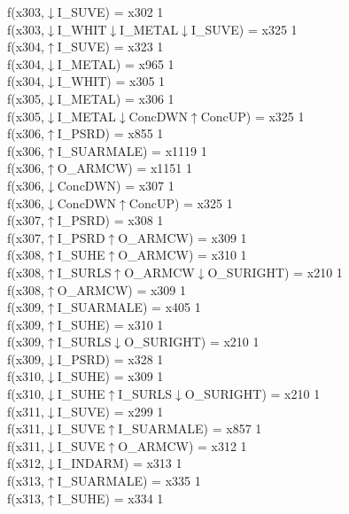 f(x303,$\downarrow$I\_SUVE) = x302 {1} \\
f(x303,$\downarrow$I\_WHIT$\downarrow$I\_METAL$\downarrow$I\_SUVE) = x325 {1} \\
f(x304,$\uparrow$I\_SUVE) = x323 {1} \\
f(x304,$\downarrow$I\_METAL) = x965 {1} \\
f(x304,$\downarrow$I\_WHIT) = x305 {1} \\
f(x305,$\downarrow$I\_METAL) = x306 {1} \\
f(x305,$\downarrow$I\_METAL$\downarrow$ConcDWN$\uparrow$ConcUP) = x325 {1} \\
f(x306,$\uparrow$I\_PSRD) = x855 {1} \\
f(x306,$\uparrow$I\_SUARMALE) = x1119 {1} \\
f(x306,$\uparrow$O\_ARMCW) = x1151 {1} \\
f(x306,$\downarrow$ConcDWN) = x307 {1} \\
f(x306,$\downarrow$ConcDWN$\uparrow$ConcUP) = x325 {1} \\
f(x307,$\uparrow$I\_PSRD) = x308 {1} \\
f(x307,$\uparrow$I\_PSRD$\uparrow$O\_ARMCW) = x309 {1} \\
f(x308,$\uparrow$I\_SUHE$\uparrow$O\_ARMCW) = x310 {1} \\
f(x308,$\uparrow$I\_SURLS$\uparrow$O\_ARMCW$\downarrow$O\_SURIGHT) = x210 {1} \\
f(x308,$\uparrow$O\_ARMCW) = x309 {1} \\
f(x309,$\uparrow$I\_SUARMALE) = x405 {1} \\
f(x309,$\uparrow$I\_SUHE) = x310 {1} \\
f(x309,$\uparrow$I\_SURLS$\downarrow$O\_SURIGHT) = x210 {1} \\
f(x309,$\downarrow$I\_PSRD) = x328 {1} \\
f(x310,$\downarrow$I\_SUHE) = x309 {1} \\
f(x310,$\downarrow$I\_SUHE$\uparrow$I\_SURLS$\downarrow$O\_SURIGHT) = x210 {1} \\
f(x311,$\downarrow$I\_SUVE) = x299 {1} \\
f(x311,$\downarrow$I\_SUVE$\uparrow$I\_SUARMALE) = x857 {1} \\
f(x311,$\downarrow$I\_SUVE$\uparrow$O\_ARMCW) = x312 {1} \\
f(x312,$\downarrow$I\_INDARM) = x313 {1} \\
f(x313,$\uparrow$I\_SUARMALE) = x335 {1} \\
f(x313,$\uparrow$I\_SUHE) = x334 {1} \\
